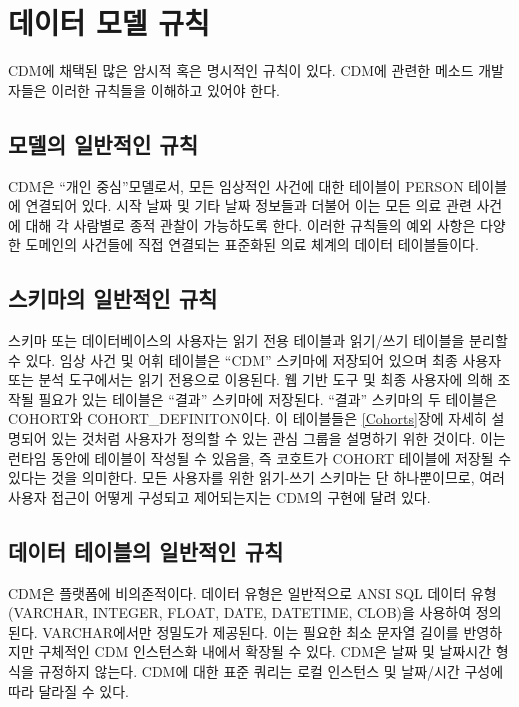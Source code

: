 \documentclass[11pt]{book}
\theoremstyle{definition}
\theoremstyle{definition}
\theoremstyle{definition}
\theoremstyle{remark}
\begin{document}
\section{데이터 모델 규칙}\label{--}

CDM에 채택된 많은 암시적 혹은 명시적인 규칙이 있다. CDM에 관련한 메소드
개발자들은 이러한 규칙들을 이해하고 있어야 한다.

\subsection{모델의 일반적인 규칙}\label{model-Conv}

CDM은 ``개인 중심''모델로서, 모든 임상적인 사건에 대한 테이블이 PERSON
테이블에 연결되어 있다. 시작 날짜 및 기타 날짜 정보들과 더불어 이는 모든
의료 관련 사건에 대해 각 사람별로 종적 관찰이 가능하도록 한다. 이러한
규칙들의 예외 사항은 다양한 도메인의 사건들에 직접 연결되는 표준화된
의료 체계의 데이터 테이블들이다.

\subsection{스키마의 일반적인 규칙}\label{--}

스키마 또는 데이터베이스의 사용자는 읽기 전용 테이블과 읽기/쓰기
테이블을 분리할 수 있다. 임상 사건 및 어휘 테이블은 ``CDM'' 스키마에
저장되어 있으며 최종 사용자 또는 분석 도구에서는 읽기 전용으로 이용된다.
웹 기반 도구 및 최종 사용자에 의해 조작될 필요가 있는 테이블은 ``결과''
스키마에 저장된다. ``결과'' 스키마의 두 테이블은 COHORT와
COHORT\_DEFINITON이다. 이 테이블들은 \ref{Cohorts}장에 자세히 설명되어
있는 것처럼 사용자가 정의할 수 있는 관심 그룹을 설명하기 위한 것이다.
이는 런타임 동안에 테이블이 작성될 수 있음을, 즉 코호트가 COHORT
테이블에 저장될 수 있다는 것을 의미한다. 모든 사용자를 위한 읽기-쓰기
스키마는 단 하나뿐이므로, 여러 사용자 접근이 어떻게 구성되고
제어되는지는 CDM의 구현에 달려 있다.

\subsection{데이터 테이블의 일반적인 규칙}\label{---}

CDM은 플랫폼에 비의존적이다. 데이터 유형은 일반적으로 ANSI SQL 데이터
유형(VARCHAR, INTEGER, FLOAT, DATE, DATETIME, CLOB)을 사용하여 정의된다.
VARCHAR에서만 정밀도가 제공된다. 이는 필요한 최소 문자열 길이를
반영하지만 구체적인 CDM 인스턴스화 내에서 확장될 수 있다. CDM은 날짜 및
날짜시간 형식을 규정하지 않는다. CDM에 대한 표준 쿼리는 로컬 인스턴스 및
날짜/시간 구성에 따라 달라질 수 있다.
\end{document}
